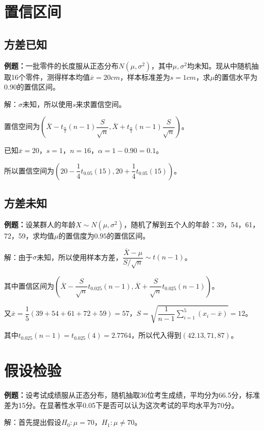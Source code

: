 \section{置信区间}

\subsection{方差已知}

\textbf{例题：}一批零件的长度服从正态分布$N(\mu,\sigma^2)$，其中$\mu,\sigma^2$均未知。现从中随机抽取16个零件，测得样本均值$\overline{x}=20cm$，样本标准差为$s=1cm$，求$\mu$的置信水平为0.90的置信区间。

解：$\sigma$未知，所以使用$s$来求置信空间。

置信空间为$(\overline{X}-t_\frac{\alpha}{2}(n-1)\dfrac{S}{\sqrt{n}},\overline{X}+t_\frac{\alpha}{2}(n-1)\dfrac{S}{\sqrt{n}})$。

已知$\overline{x}=20$，$s=1$，$n=16$，$\alpha=1-0.90=0.1$。

所以置信空间为$\left(20-\dfrac{1}{4}t_{0.05}(15),20+\dfrac{1}{4}t_{0.05}(15)\right)$。

\subsection{方差未知}

\textbf{例题：}设某群人的年龄$X\sim N(\mu,\sigma^2)$，随机了解到五个人的年龄：39，54，61，72，59，求均值$\mu$的置信度为$0.95$的置信区间。

解：由于$\sigma$未知，所以使用样本方差，$\dfrac{\overline{X}-\mu}{S/\sqrt{n}}\sim t(n-1)$。

其中置信区间为$\left(\overline{X}-\dfrac{S}{\sqrt{n}}t_{0.025}(n-1),\overline{X}+\dfrac{S}{\sqrt{n}}t_{0.025}(n-1)\right)$。

又$\overline{x}=\dfrac{1}{5}(39+54+61+72+59)=57$，$S=\sqrt{\dfrac{1}{n-1}\sum\limits_{i=1}^5(x_i-\overline{x})}=12$。

其中$t_{0.025}(n-1)=t_{0.025}(4)=2.7764$，所以代入得到$(42.13,71,87)$。

\section{假设检验}

\textbf{例题：}设考试成绩服从正态分布，随机抽取36位考生成绩，平均分为66.5分，标准差为15分。在显著性水平0.05下是否可以认为这次考试的平均水平为70分。

解：首先提出假设$H_0:\mu=70$，$H_1:\mu\neq70$。

